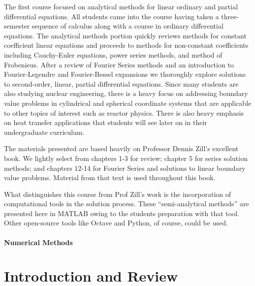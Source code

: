 \documentclass{tufte-book}
\theoremstyle{break}
\begin{document}
The first course focused on analytical methods for linear ordinary and partial differential equations.  All students came into the course having taken a three-semester sequence of calculus along with a course in ordinary differential equations.  The analytical methods portion quickly reviews methods for constant coefficient linear equations and proceeds to methods for non-constant coefficients including Cauchy-Euler equations, power series methods, and method of Frobenieus.  After a review of Fourier Series methods and an introduction to Fourier-Legendre and Fourier-Bessel expansions we thoroughly explore solutions to second-order, linear, partial differential equations.  Since many students are also studying nuclear engineering, there is a heavy focus on addressing boundary value problems in cylindrical and spherical coordinate systems that are applicable to other topics of interest such as reactor physics.  There is also heavy emphasis on heat transfer applications that students will see later on in their undergraduate curriculum.

The materials presented are based heavily on Professor Dennis Zill's excellent book.\cite[-3cm]{zill2020advanced} We lightly select from chapters 1-3 for review; chapter 5 for series solution methods; and chapters 12-14 for Fourier Series and solutions to linear boundary value problems.  Material from that text is used throughout this book.  

What distinguishes this course from Prof Zill's work is the incorporation of computational tools in the solution process.  These ``semi-analytical methods'' are presented here in MATLAB\cite[-3.75cm]{matlab} owing to the students preparation with that tool.  Other open-source tools like Octave\cite[-3.5cm]{octave} and Python,\cite[-1cm]{10.5555/1593511} of course, could be used. 

\subsection*{Numerical Methods}

\mainmatter

\part{Introduction and Review}







\end{document}
